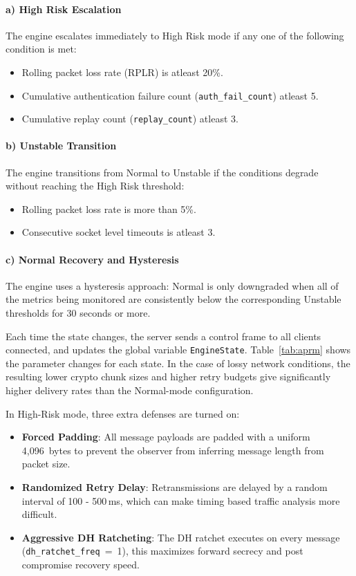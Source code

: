 \documentclass[conference]{IEEEtran}
\begin{document}
\paragraph{a) High Risk Escalation}
The engine escalates immediately to High Risk mode if any one of the following condition is met:
\begin{itemize}
    \item Rolling packet loss rate (RPLR) is atleast 20\%.
    \item Cumulative authentication failure count (\texttt{auth\_fail\_count}) atleast 5.
    \item Cumulative replay count (\texttt{replay\_count}) atleast 3.
\end{itemize}

\paragraph{b) Unstable Transition}
The engine transitions from Normal to Unstable if the conditions degrade without reaching the High Risk threshold:
\begin{itemize}
    \item Rolling packet loss rate is more than 5\%.
    \item Consecutive socket level timeouts is atleast 3.
\end{itemize}

\paragraph{c) Normal Recovery and Hysteresis}
The engine uses a hysteresis approach: Normal is only downgraded when all of the metrics being monitored are consistently below the corresponding Unstable thresholds for 30 seconds or more.

Each time the state changes, the server sends a control frame to all clients connected, and updates the global variable \texttt{EngineState}. Table~\ref{tab:aprm} shows the parameter changes for each state. In the case of lossy network conditions, the resulting lower crypto chunk sizes and higher retry budgets give significantly higher delivery rates than the Normal-mode configuration.

In High-Risk mode, three extra defenses are turned on:
\begin{itemize}
    \item \textbf{Forced Padding}: All message payloads are padded with a uniform 4,096~bytes to prevent the observer from inferring message length from packet size.
    \item \textbf{Randomized Retry Delay}: Retransmissions are delayed by a random interval of 100 - 500\,ms, which can make timing based traffic analysis more difficult.
    \item \textbf{Aggressive DH Ratcheting}: The DH ratchet executes on every message (\texttt{dh\_ratchet\_freq}~=~1), this maximizes forward secrecy and post compromise recovery speed.
\end{itemize}
\end{document}
